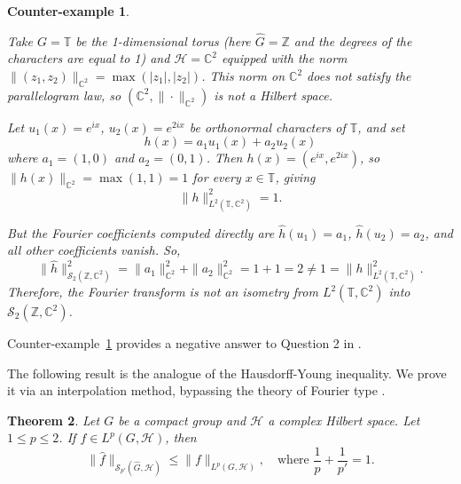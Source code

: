 \documentclass[10pt,a4paper]{amsart}
\newtheorem{theorem}{Theorem}[section]
\newtheorem{counterexample}[theorem]{Counter-example}
\begin{document}
\begin{counterexample}\label{ex:planch-fails-Cstar}{\rm
Take $G=\mathbb T$ be the 1-dimensional torus (here $\widehat{G}=\mathbb Z$ and the degrees of the characters are equal to 1)  and $\mathcal{H}=\mathbb C^2$ equipped with
the norm $\|(z_1,z_2)\|_{\mathbb C^2}=\max(|z_1|,|z_2|)$. This norm on $\mathbb C^2$ does not satisfy the parallelogram law, so $\left(\mathbb C^2,\|\cdot\|_{\mathbb C^2} \right)$ is not a Hilbert space. 

Let $u_1(x)=e^{ix}$, $u_2(x)=e^{2ix}$ be orthonormal characters of
$\mathbb T$, and set
$$
h(x)=a_1u_1(x)+a_2u_2(x)$$
where $a_1=(1,0)$ and $a_2=(0,1)$.
Then $h(x)=(e^{ix},e^{2ix})$, so $\|h(x)\|_{\mathbb C^2}=\max(1,1)=1$ for every $x\in\mathbb T$,
giving
\[
\|h\|_{L^2(\mathbb T,\mathbb C^2)}^2=1.
\]

\noindent But  the Fourier coefficients computed directly are $\widehat h(u_1)=a_1$, $\widehat h(u_2)=a_2$,
and all other coefficients vanish. So, 
\[
\|\widehat h\|_{\mathscr{S}_2(\mathbb Z,\mathbb C^2)}^2=\|a_1\|_{\mathbb C^2}^2+\|a_2\|_{\mathbb C^2}^2=1+1=2\neq 1
=\|h\|_{L^2(\mathbb T,\mathbb C^2)}^2.
\]
 Therefore, the  Fourier transform is not
an isometry from $L^2(\mathbb T,\mathbb C^2)$ into $\mathscr{S}_2(\mathbb Z,\mathbb C^2)$. 
}\end{counterexample}
Counter-example~\ref{ex:planch-fails-Cstar}  provides a negative answer to Question 2 in \cite{Mensah2024}. 

\smallskip

The following result is the analogue of the Hausdorff-Young inequality. We prove it via an interpolation method, bypassing the theory of Fourier type \cite{GarciaRubio, Peetre}.

\begin{theorem}\label{prop:HY-final}
Let $G$  be a compact group and  $\mathcal{H}$ a complex Hilbert space. Let   $1\le p\le 2$. If $f\in L^p(G,\mathcal{H})$, then
\[
\|\widehat f\|_{\mathscr{S}_{p'}(\widehat{G},\mathcal{H})}\le\|f\|_{L^p(G,\mathcal{H})},\quad\text{where }
\frac1p+\frac1{p'}=1.
\]
\end{theorem}
\end{document}
